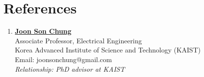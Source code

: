 \documentclass[a4paper,11pt]{article}
\begin{document}
\section{\textbf{References}}
\vspace{-0.2mm}
\small{
\begin{enumerate}[leftmargin=*,labelsep=2mm]



\item \href{https://mm.kaist.ac.kr/joon/}{\textbf{Joon Son Chung}}\\
   Associate Professor, Electrical Engineering\\
   Korea Advanced Institute of Science and Technology (KAIST) \\
   Email: joonsonchung@gmail.com\\
   \textit{Relationship: PhD advisor at KAIST}

\end{enumerate}
}
\end{document}
